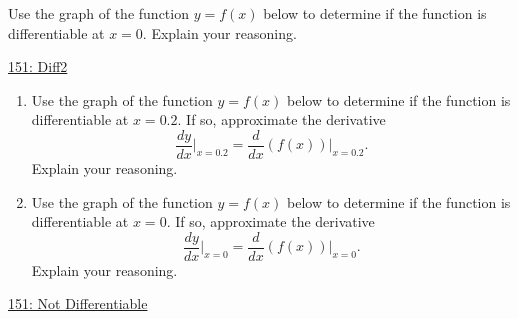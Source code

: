 \documentclass{ximera}
\begin{document}
\begin{exploration} \label{Exp4kfgk4g4}
Use the graph of the function $y=f(x)$ below to determine if the function is differentiable at $x=0$. Explain your reasoning.

\begin{onlineOnly}
    \begin{center}
\end{center}
\end{onlineOnly}

\href{https://www.desmos.com/calculator/ov8qt938ot}{151: Diff2}
\end{exploration}


\begin{exploration} \label{Exp4dfd44444g4}
\begin{enumerate}

\item Use the graph of the function $y=f(x)$ below to determine if the function is differentiable at $x=0.2$. If so, approximate the derivative
\[
      \frac{dy}{dx}\Big|_{x=0.2} = \frac{d}{dx}\left( f(x) \right) \Big|_{x=0.2}.
\]
Explain your reasoning.

\item Use the graph of the function $y=f(x)$ below to determine if the function is differentiable at $x=0$. If so, approximate the derivative
\[
      \frac{dy}{dx}\Big|_{x=0} = \frac{d}{dx}\left( f(x) \right) \Big|_{x=0}.
\]
Explain your reasoning.


\end{enumerate}

\begin{onlineOnly}
    \begin{center}
\end{center}
\end{onlineOnly}

\href{https://www.desmos.com/calculator/tvwtbx9hco}{151: Not Differentiable}
\end{exploration}
\end{document}
